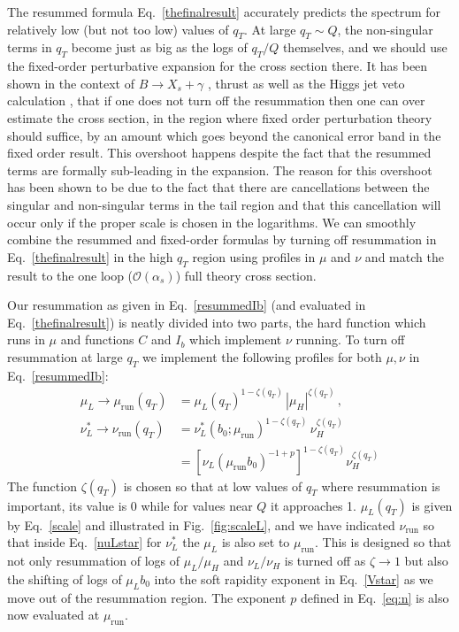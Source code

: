 \documentclass[a4,letterpaper,11pt]{article}
\newcommand{\nn}{\nonumber}
\newcommand{\abs}[1]{\left\lvert #1\right\rvert}
\newcommand{\run}{\text{run}}
\newcommand{\mur}{\mu_\run}
\newcommand{\nur}{\nu_\run}
\newcommand{\cO}{\mathcal{O}}
\newcommand{\eq}[1]{Eq.~\eqref{#1}}
\newcommand{\fig}[1]{Fig.~\ref{fig:#1}}
\begin{document}
The resummed formula \eq{thefinalresult} accurately predicts the spectrum for relatively low (but not too low) values of $q_T$. At large $q_T\sim Q$, the non-singular terms in $q_T$ become just as big as the logs of $q_T/Q$ themselves, and we should use the fixed-order perturbative expansion for the cross section 
there.  It has been shown in the context of $B\rightarrow X_s +\gamma$ \cite{Ligeti:2008ac}, thrust \cite{Abbate:2010xh} as well as the Higgs jet veto calculation \cite{Berger:2010xi}, that if one does not turn off the resummation then one can over estimate the cross section, in the region where fixed order perturbation theory should suffice,  by an amount which goes beyond the canonical error band in the fixed order result.
This overshoot happens despite the fact that the resummed terms are formally sub-leading
in the expansion.  The reason for this overshoot has  been shown \cite{Ligeti:2008ac, Berger:2010xi, Abbate:2010xh}  to be due to the fact that
there are cancellations between the singular and non-singular terms in the tail region and that
this cancellation will occur only if the proper scale is chosen in the logarithms. We can smoothly combine the resummed and fixed-order formulas by turning off resummation in \eq{thefinalresult} in the high $q_T$ region using profiles in $\mu $ and $\nu$ \cite{Abbate:2010xh}
and match the result to the one loop ($\cO(\alpha_s)$) full theory cross section.

Our resummation as given in \eq{resummedIb} (and evaluated in \eq{thefinalresult}) is neatly divided into two parts, the hard function which runs in $\mu$ and functions $C$ and $I_b$ which implement $\nu$ running.
To turn off resummation at large $q_T$ we implement the following profiles for both $\mu, \nu$ in \eq{resummedIb}:
\begin{subequations}
\begin{align} \label{run}
\mu_L \to \mur (q_T) &= \mu_L(q_T) ^{1-\zeta(q_T)}\, \abs{\mu_H}^{\zeta(q_T)}  \,, \\
\nu_L^* \to \nur (q_T) &= \nu_L^*(b_0;\mur)^{1-\zeta(q_T)}\, \nu_H^{\zeta(q_T)} \\
&=   [\nu_L(\mur b_0)^{-1+p}]^{1-\zeta(q_T)} \nu_H^{\zeta(q_T)} \nn 
\end{align}
\end{subequations}
The function $\zeta(q_T)$ is chosen so that at low values of $q_T$ where resummation is important, its value is 0 while for values near $Q$ it approaches 1. 
$\mu_L(q_T) $ is given by \eq{scale} and illustrated in \fig{scaleL},  and we have indicated $\nur$ so that inside \eq{nuLstar} for $\nu_L^*$ the $\mu_L$ is also set to $\mur$. This is designed so that not only resummation of logs of $\mu_L/\mu_H$ and $\nu_L/\nu_H$ is turned off as $\zeta\to 1$ but also the shifting of logs of $\mu_L b_0$ into the soft rapidity exponent in \eq{Vstar} as we move out of the resummation region. The exponent $p$ defined in \eq{eq:n} is also now evaluated at $\mur$.
\end{document}
